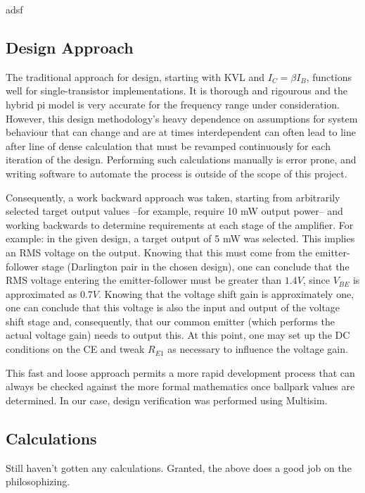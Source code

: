 \documentclass[journal]{IEEEtran}
\begin{document}
adsf

\subsection{Design Approach}

The traditional approach for design, starting with KVL and $I_{C}=\beta I_{B}$, functions well for single-transistor implementations. It is thorough and rigourous and the hybrid pi model is very accurate for the frequency range under consideration. However, this design methodology's heavy dependence on assumptions for system behaviour that can change and are at times interdependent can often lead to line after line of dense calculation that must be revamped continuously for each iteration of the design. Performing such calculations manually is error prone, and writing software to automate the process is outside of the scope of this project. 

Consequently, a work backward approach was taken, starting from arbitrarily selected target output values --for example, require 10 mW output power-- and working backwards to determine requirements at each stage of the amplifier. For example: in the given design, a target output of 5 mW was selected. This implies an RMS voltage on the output. Knowing that this must come from the emitter-follower stage (Darlington pair in the chosen design), one can conclude that the RMS voltage entering the emitter-follower must be greater than $1.4 V$, since $V_{BE}$ is approximated as $0.7 V$. Knowing that the voltage shift gain is approximately one, one can conclude that this voltage is also the input and output of the voltage shift stage and, consequently, that our common emitter (which performs the actual voltage gain) needs to output this. At this point, one may set up the DC conditions on the CE and tweak $R_{E1}$ as necessary to influence the voltage gain.

This fast and loose approach permits a more rapid development process that can always be checked against the more formal mathematics once ballpark values are determined. In our case, design verification was performed using Multisim.

\subsection{Calculations}

Still haven't gotten any calculations. Granted, the above does a good job on the philosophizing.
\end{document}
